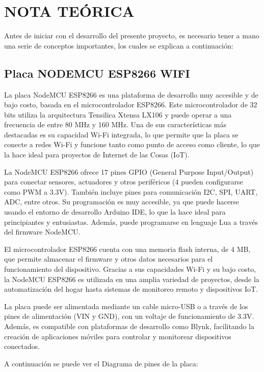 \newpage
\section{NOTA TEÓRICA}

Antes de iniciar con el desarrollo del presente proyecto, es necesario tener a mano una serie de conceptos importantes, los cuales se explican a continuación: 

\subsection{Placa NODEMCU ESP8266 WIFI}

La placa NodeMCU ESP8266 es una plataforma de desarrollo muy accesible y de bajo costo, basada en el microcontrolador ESP8266. Este microcontrolador de 32 bits utiliza la arquitectura Tensilica Xtensa LX106 y puede operar a una frecuencia de entre 80 MHz y 160 MHz. Una de sus características más destacadas es su capacidad Wi-Fi integrada, lo que permite que la placa se conecte a redes Wi-Fi y funcione tanto como punto de acceso como cliente, lo que la hace ideal para proyectos de Internet de las Cosas (IoT).

La NodeMCU ESP8266 ofrece 17 pines GPIO (General Purpose Input/Output) para conectar sensores, actuadores y otros periféricos (4 pueden configurarse como PWM a 3.3V). También incluye pines para comunicación I2C, SPI, UART, ADC, entre otros. Su programación es muy accesible, ya que puede hacerse usando el entorno de desarrollo Arduino IDE, lo que la hace ideal para principiantes y entusiastas. Además, puede programarse en lenguaje Lua a través del firmware NodeMCU.

El microcontrolador ESP8266 cuenta con una memoria flash interna, de 4 MB, que permite almacenar el firmware y otros datos necesarios para el funcionamiento del dispositivo. Gracias a sus capacidades Wi-Fi y su bajo costo, la NodeMCU ESP8266 es utilizada en una amplia variedad de proyectos, desde la automatización del hogar hasta sistemas de monitoreo remoto y dispositivos IoT.

La placa puede ser alimentada mediante un cable micro-USB o a través de los pines de alimentación (VIN y GND), con un voltaje de funcionamiento de 3.3V. Además, es compatible con plataformas de desarrollo como Blynk, facilitando la creación de aplicaciones móviles para controlar y monitorear dispositivos conectados.

A continuación se puede ver el Diagrama de pines de la placa:

